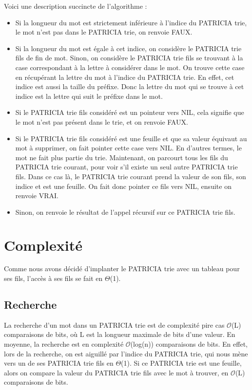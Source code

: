 \documentclass[a4paper,12pt]{report}
\begin{document}
Voici une description succincte de l'algorithme :

\begin{itemize}
 \item Si la longueur du mot est strictement inférieure à l'indice du PATRICIA trie, le mot n'est pas dans le PATRICIA trie, on renvoie FAUX.
 \item Si la longueur du mot est égale à cet indice, on considère le PATRICIA trie fils de fin de mot. Sinon, on considère le PATRICIA trie fils se trouvant à la case correspondant à la lettre à considérer dans le mot. On trouve cette case en récupérant la lettre du mot à l'indice du PATRICIA trie. En effet, cet indice est aussi la taille du préfixe. Donc la lettre du mot qui se trouve à cet indice est la lettre qui suit le préfixe dans le mot. 
 \item Si le PATRICIA trie fils considéré est un pointeur vers NIL, cela signifie que le mot n'est pas présent dans le trie, et on renvoie FAUX.
 \item Si le PATRICIA trie fils considéré est une feuille et que sa valeur équivaut au mot à supprimer, on fait pointer cette case vers NIL. En d'autres termes, le mot ne fait plus partie du trie. Maintenant, on parcourt tous les fils du PATRICIA trie courant, pour voir s'il existe un seul autre PATRICIA trie fils. Dans ce cas là, le PATRICIA trie courant prend la valeur de son fils, son indice et est une feuille. On fait donc pointer ce fils vers NIL, ensuite on renvoie VRAI.
 \item Sinon, on renvoie le résultat de l'appel récursif sur ce PATRICIA trie fils.
\end{itemize}

\section{Complexité}

Comme nous avons décidé d'implanter le PATRICIA trie avec un tableau pour ses fils, l'accès à ses fils se fait en $\Theta$(1).

\subsection{Recherche}
La recherche d'un mot dans un PATRICIA trie est de complexité pire cas $\mathcal{O}$(L) comparaisons de bits, où L est la longueur maximale de bits d'une valeur.
En moyenne, la recherche est en complexité $\mathcal{O}$(log(n)) comparaisons de bits.
En effet, lors de la recherche, on est aiguillé par l'indice du PATRICIA trie, qui nous mène vers un de ses PATRICIA trie fils en $\Theta$(1). Si ce PATRICIA trie est une feuille, alors on compare la valeur du PATRICIA trie fils avec le mot à trouver, en $\mathcal{O}$(L) comparaisons de bits.
\end{document}
